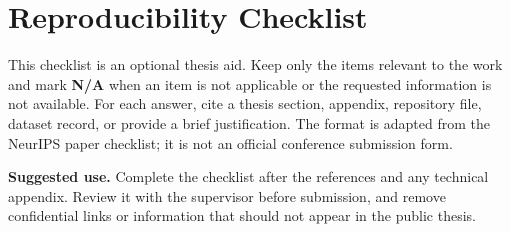 
\chapter{Reproducibility Checklist}\label{app:reproducibility-checklist}

\begin{keypoint}
This checklist is an optional thesis aid. Keep only the items relevant to the
work and mark \textbf{N/A} when an item is not applicable or the requested
information is not available. For each answer, cite a thesis section, appendix,
repository file, dataset record, or provide a brief justification. The format
is adapted from the NeurIPS paper checklist; it is not an official conference
submission form.
\end{keypoint}

\noindent\textbf{Suggested use.}
Complete the checklist after the references and any technical appendix. Review
it with the supervisor before submission, and remove confidential links or
information that should not appear in the public thesis.

